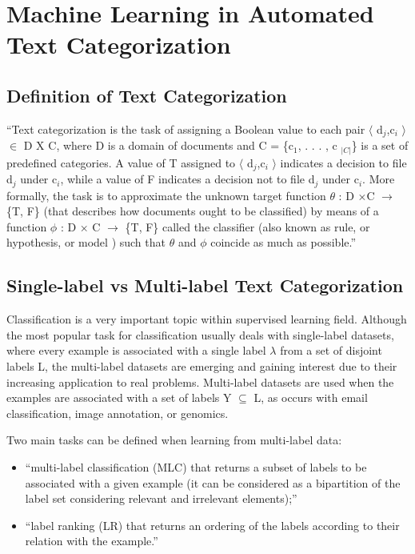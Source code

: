 \section{Machine Learning in Automated Text Categorization}
\label{sec:ml_text_categ}

\subsection{Definition of Text Categorization}
``Text categorization is the task of assigning a Boolean value to each pair 
$\langle$ d$_{j}$,c$_{i}$ $\rangle$ $\in$ D X C,  where D is a domain of documents 
and C = \{c$_{1}$, . . . , c $_{|C|}$\} is a set of predefined categories. A value 
of T assigned to $\langle$ d$_{j}$,c$_{i}$ $\rangle$ indicates a decision to 
file d$_{j}$ under c$_{i}$, while a value of F indicates a decision not to 
file d$_{j}$ under c$_{i}$. More formally, the task is to approximate the unknown 
target function $\theta$ : D ×C $\rightarrow$ \{T, F\} (that describes how documents 
ought to be classified) by means of a function $\phi$ : D × C $\rightarrow$ \{T, F\} 
called the classifier (also known as rule, or hypothesis, or model ) such that $\theta$ and 
$\phi$ coincide as much as possible.''\cite{Sebastiani2002}

\subsection{Single-label vs Multi-label Text Categorization}
Classification is a very important topic within supervised learning field. 
Although the most popular task for classification usually deals with 
single-label datasets, where every example is associated with a single label 
$\lambda$ from a set of disjoint labels L, the multi-label datasets are emerging 
and gaining interest due to their increasing application to real problems. Multi-label 
datasets are used when the examples are associated with a set of labels Y 
$\subseteq$ L, as occurs with email classification, image annotation, or genomics.

Two main tasks can be defined when learning from multi-label data: 
\begin{itemize}
  \item ``multi-label classification (MLC) that returns a subset of labels to be 
  associated with a given example (it can be considered as a bipartition of the 
  label set considering relevant and irrelevant elements);''  \cite{Carmona2011}
  \item ``label ranking (LR) that returns an ordering of the labels according to 
  their relation with the example.'' \cite{Carmona2011}
\end{itemize}

